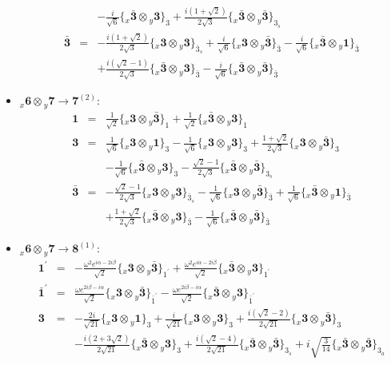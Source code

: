 \documentclass[english]{article}
\newcommand{\rep}[1]{\mathbf{#1}}
\newcommand{\repx}[2]{{}_{#2}\mathbf{#1}}
\newcommand{\subcg}[3]{\big\{ \repx{#1}{x}\otimes\repx{#2}{y}\big\}^{}_{#3}}
\begin{document}
\begin{itemize}
\begin{eqnarray*}
 & & -\frac{i}{\sqrt{6}}\subcg{\bar{3}}{3}{3}+\frac{i \left(1+\sqrt{2}\right)}{2 \sqrt{3}}\subcg{\bar{3}}{\bar{3}}{3_{s}}
\\
\rep{\bar{3}} &=& -\frac{i \left(1+\sqrt{2}\right)}{2 \sqrt{3}}\subcg{3}{3}{\bar{3}_{s}}+\frac{i}{\sqrt{6}}\subcg{3}{\bar{3}}{\bar{3}}-\frac{i}{\sqrt{6}}\subcg{\bar{3}}{1}{\bar{3}} \\ 
 & & +\frac{i \left(\sqrt{2}-1\right)}{2 \sqrt{3}}\subcg{\bar{3}}{3}{\bar{3}}-\frac{i}{\sqrt{6}}\subcg{\bar{3}}{\bar{3}}{\bar{3}}
\end{eqnarray*}
\item $\repx{6}{x}\otimes\repx{7}{y}\to\rep{7}^{(2)}$:
\begin{eqnarray*}
\rep{1} &=& \frac{1}{\sqrt{2}}\subcg{3}{\bar{3}}{1}+\frac{1}{\sqrt{2}}\subcg{\bar{3}}{3}{1}
\\
\rep{3} &=& \frac{1}{\sqrt{6}}\subcg{3}{1}{3}-\frac{1}{\sqrt{6}}\subcg{3}{3}{3}+\frac{1+\sqrt{2}}{2 \sqrt{3}}\subcg{3}{\bar{3}}{3} \\ 
 & & -\frac{1}{\sqrt{6}}\subcg{\bar{3}}{3}{3}-\frac{\sqrt{2}-1}{2 \sqrt{3}}\subcg{\bar{3}}{\bar{3}}{3_{s}}
\\
\rep{\bar{3}} &=& -\frac{\sqrt{2}-1}{2 \sqrt{3}}\subcg{3}{3}{\bar{3}_{s}}-\frac{1}{\sqrt{6}}\subcg{3}{\bar{3}}{\bar{3}}+\frac{1}{\sqrt{6}}\subcg{\bar{3}}{1}{\bar{3}} \\ 
 & & +\frac{1+\sqrt{2}}{2 \sqrt{3}}\subcg{\bar{3}}{3}{\bar{3}}-\frac{1}{\sqrt{6}}\subcg{\bar{3}}{\bar{3}}{\bar{3}}
\end{eqnarray*}
\item $\repx{6}{x}\otimes\repx{7}{y}\to\rep{8}^{(1)}$:
\begin{eqnarray*}
\rep{1^{\prime}} &=& -\frac{\omega ^2 e^{i \alpha -2 i \beta }}{\sqrt{2}}\subcg{3}{\bar{3}}{1^{\prime}}+\frac{\omega ^2 e^{i \alpha -2 i \beta }}{\sqrt{2}}\subcg{\bar{3}}{3}{1^{\prime}}
\\
\rep{\bar{1}^{\prime}} &=& \frac{\omega  e^{2 i \beta -i \alpha }}{\sqrt{2}}\subcg{3}{\bar{3}}{\bar{1}^{\prime}}-\frac{\omega  e^{2 i \beta -i \alpha }}{\sqrt{2}}\subcg{\bar{3}}{3}{\bar{1}^{\prime}}
\\
\rep{3} &=& -\frac{2 i}{\sqrt{21}}\subcg{3}{1}{3}+\frac{i}{\sqrt{21}}\subcg{3}{3}{3}+\frac{i \left(\sqrt{2}-2\right)}{2 \sqrt{21}}\subcg{3}{\bar{3}}{3} \\ 
 & & -\frac{i \left(2+3 \sqrt{2}\right)}{2 \sqrt{21}}\subcg{\bar{3}}{3}{3}+\frac{i \left(\sqrt{2}-4\right)}{2 \sqrt{21}}\subcg{\bar{3}}{\bar{3}}{3_{s}}+i \sqrt{\frac{3}{14}}\subcg{\bar{3}}{\bar{3}}{3_{a}}
\\

\end{eqnarray*}
\end{itemize}
\end{document}
